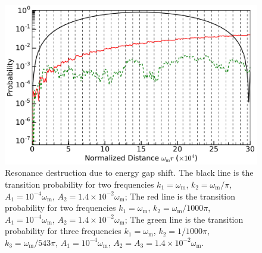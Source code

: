 \documentclass[%
reprint,
 amsmath,amssymb,
 aps,
]{revtex4-1}
\begin{document}
\begin{figure}[!htbp]
    \centering
    \includegraphics[width=\columnwidth]{assets/interference-reduction-three-modes}
    \caption{Resonance destruction due to energy gap shift. The black line is the transition probability for two frequencies $k_1=\omega_{\mathrm m}$, $k_2=\omega_{\mathrm m}/\pi$, $A_1=10^{-4}\omega_{\mathrm m}$, $A_2 = 1.4\times 10^{-2}\omega_{\mathrm m}$; The red line is the transition probability for two frequencies $k_1=\omega_{\mathrm m}$, $k_2=\omega_{\mathrm m}/1000 \pi$, $A_1=10^{-4}\omega_{\mathrm m}$, $A_2 = 1.4\times 10^{-2}\omega_{\mathrm m}$; The green line is the transition probability for three frequencies $k_1=\omega_{\mathrm m}$, $k_2=1/1000\pi$, $k_3=\omega_{\mathrm m}/543\pi$, $A_1=10^{-4}\omega_{\mathrm m}$, $A_2 =A_3 = 1.4\times10^{-2}\omega_{\mathrm m}$.}
    \label{fig-interference-reduction-three-modes}
\end{figure}



















\end{document}
